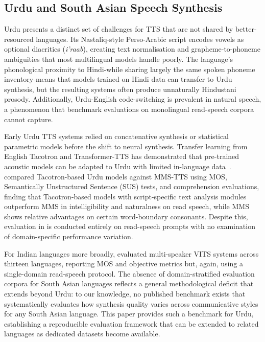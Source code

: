 \documentclass[a4paper,fleqn]{cas-dc}
\begin{document}
    \subsection{Urdu and South Asian Speech Synthesis}\label{sec:related-urdu}
    
    Urdu presents a distinct set of challenges for TTS that are not shared by
    better-resourced languages. Its Nastaliq-style Perso-Arabic script encodes vowels
    as optional diacritics (\textit{i'raab}), creating text normalisation and
    grapheme-to-phoneme ambiguities that most multilingual models handle poorly. The
    language's phonological proximity to Hindi-while sharing largely the same spoken
    phoneme inventory-means that models trained on Hindi data can transfer to Urdu
    synthesis, but the resulting systems often produce unnaturally Hindustani prosody.
    Additionally, Urdu-English code-switching is prevalent in natural speech, a
    phenomenon that benchmark evaluations on monolingual read-speech corpora cannot
    capture.
    
    Early Urdu TTS systems relied on concatenative synthesis or statistical parametric
    models before the shift to neural synthesis. Transfer learning from English Tacotron
    and Transformer-TTS has demonstrated that pre-trained acoustic models can be adapted
    to Urdu with limited in-language data~\citep{jamal2022transfer}.
    \citet{naseem2024developing} compared Tacotron-based Urdu models against MMS-TTS using
    MOS, Semantically Unstructured Sentence (SUS) tests, and comprehension evaluations,
    finding that Tacotron-based models with script-specific text analysis modules
    outperform MMS in intelligibility and naturalness on read speech, while MMS shows
    relative advantages on certain word-boundary consonants. Despite this, evaluation
    in \citet{naseem2024developing} is conducted entirely on read-speech prompts with no
    examination of domain-specific performance variation.
    
    For Indian languages more broadly, \citet{kumar2023indic} evaluated multi-speaker
    VITS systems across thirteen languages, reporting MOS and objective metrics but,
    again, using a single-domain read-speech protocol. The absence of domain-stratified
    evaluation corpora for South Asian languages reflects a general methodological
    deficit that extends beyond Urdu: to our knowledge, no published benchmark exists
    that systematically evaluates how synthesis quality varies across communicative
    styles for any South Asian language. This paper provides such a benchmark for Urdu,
    establishing a reproducible evaluation framework that can be extended to related
    languages as dedicated datasets become available.
    
\end{document}
